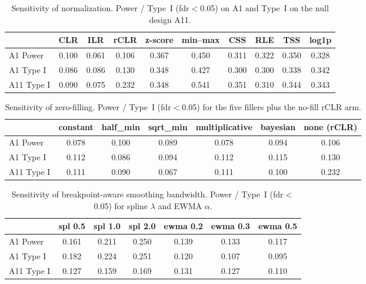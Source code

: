 \documentclass[11pt]{article}
\begin{document}
\begin{table}[t]
\centering
\caption{Sensitivity of normalization. Power / Type~I (fdr$<$0.05) on A1 and Type~I on the null
design A11.}
\label{tab:sennorm}
\small
\begin{tabular}{lccccccccc}
\toprule
 & CLR & ILR & rCLR & z-score & min--max & CSS & RLE & TSS & log1p \\
\midrule
A1 Power  & 0.100 & 0.061 & 0.106 & 0.367 & 0.450 & 0.311 & 0.322 & 0.350 & 0.328 \\
A1 Type I & 0.086 & 0.086 & 0.130 & 0.348 & 0.427 & 0.300 & 0.300 & 0.338 & 0.342 \\
A11 Type I & 0.090 & 0.075 & 0.232 & 0.348 & 0.541 & 0.351 & 0.310 & 0.344 & 0.343 \\
\bottomrule
\end{tabular}
\end{table}

\begin{table}[t]
\centering
\caption{Sensitivity of zero-filling. Power / Type~I (fdr$<$0.05) for the five fillers plus the
no-fill rCLR arm.}
\label{tab:senzero}
\small
\begin{tabular}{lcccccc}
\toprule
 & constant & half\_min & sqrt\_min & multiplicative & bayesian & none (rCLR) \\
\midrule
A1 Power  & 0.078 & 0.100 & 0.089 & 0.078 & 0.094 & 0.106 \\
A1 Type I & 0.112 & 0.086 & 0.094 & 0.112 & 0.115 & 0.130 \\
A11 Type I & 0.111 & 0.090 & 0.067 & 0.111 & 0.100 & 0.232 \\
\bottomrule
\end{tabular}
\end{table}

\begin{table}[t]
\centering
\caption{Sensitivity of breakpoint-aware smoothing bandwidth. Power / Type~I (fdr$<$0.05) for
spline $\lambda$ and EWMA $\alpha$.}
\label{tab:senband}
\small
\begin{tabular}{lcccccc}
\toprule
 & spl 0.5 & spl 1.0 & spl 2.0 & ewma 0.2 & ewma 0.3 & ewma 0.5 \\
\midrule
A1 Power  & 0.161 & 0.211 & 0.250 & 0.139 & 0.133 & 0.117 \\
A1 Type I & 0.182 & 0.224 & 0.251 & 0.120 & 0.107 & 0.095 \\
A11 Type I & 0.127 & 0.159 & 0.169 & 0.131 & 0.127 & 0.110 \\
\bottomrule
\end{tabular}
\end{table}
\end{document}
